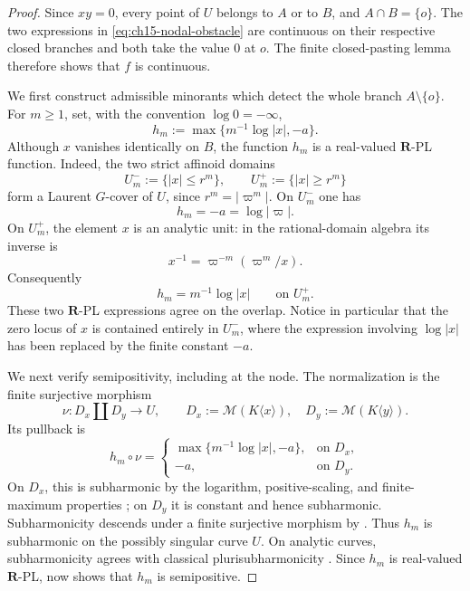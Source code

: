\begin{proof}
Since $xy=0$, every point of $U$ belongs to $A$ or to $B$, and
$A\cap B=\{o\}$.  The two expressions in
\eqref{eq:ch15-nodal-obstacle} are continuous on their respective closed
branches and both take the value $0$ at $o$.  The finite closed-pasting
lemma therefore shows that $f$ is continuous.

We first construct admissible minorants which detect the whole branch
$A\setminus\{o\}$.  For $m\geq1$, set, with the convention
$\log0=-\infty$,
\begin{equation}
\label{eq:ch15-nodal-hm}
                  h_m:=\max\{m^{-1}\log|x|,-a\}.
\end{equation}
Although $x$ vanishes identically on $B$, the function $h_m$ is a
real-valued $\mathbf R$-PL function.  Indeed, the two strict affinoid
domains
\[
 U_m^-:=\{|x|\leq r^m\},
 \qquad
 U_m^+:=\{|x|\geq r^m\}
\]
form a Laurent $G$-cover of $U$, since $r^m=|\varpi^m|$.  On $U_m^-$
one has
\[
                         h_m=-a=\log|\varpi|.
\]
On $U_m^+$, the element $x$ is an analytic unit: in the rational-domain
algebra its inverse is
\[
                  x^{-1}=\varpi^{-m}(\varpi^m/x).
\]
Consequently
\[
                         h_m=m^{-1}\log|x|
                         \qquad\text{on }U_m^+.
\]
These two $\mathbf R$-PL expressions agree on the overlap.  Notice in
particular that the zero locus of $x$ is contained entirely in $U_m^-$,
where the expression involving $\log|x|$ has been replaced by the finite
constant $-a$.

We next verify semipositivity, including at the node.  The normalization is
the finite surjective morphism
\[
 \nu:D_x\amalg D_y\longrightarrow U,
 \qquad
 D_x:=\mathcal M(K\langle x\rangle),
 \quad
 D_y:=\mathcal M(K\langle y\rangle).
\]
Its pullback is
\[
 h_m\circ\nu=
 \begin{cases}
  \max\{m^{-1}\log|x|,-a\},&\text{on }D_x,\\
  -a,&\text{on }D_y.
 \end{cases}
\]
On $D_x$, this is subharmonic by the logarithm, positive-scaling, and
finite-maximum properties
\cite[Proposition~3.5(2),(4)]{GR25Classical}; on $D_y$ it is constant and
hence subharmonic.  Subharmonicity descends under a finite surjective
morphism by \cite[Proposition~3.5(8)]{GR25Classical}.  Thus $h_m$ is
subharmonic on the possibly singular curve $U$.  On analytic curves,
subharmonicity agrees with classical plurisubharmonicity
\cite[\S4.1.2]{GR25Classical}.  Since $h_m$ is real-valued
$\mathbf R$-PL, \cite[Theorem~4.3]{GR25Classical} now shows that $h_m$
is semipositive.


\end{proof}
